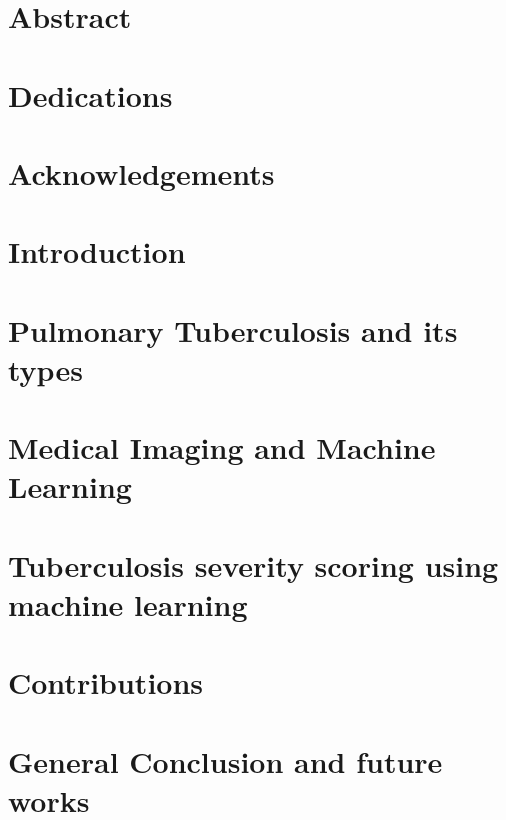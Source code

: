 \documentclass[12pt]{report}
\begin{document}
\chapter*{Abstract}

\chapter*{Dedications}

\chapter*{Acknowledgements}

\tableofcontents
{}
\newpage    
\listoffigures
\listoftables
\printacronyms[include-classes=abbrev,name=Abbreviations]
\chapter*{Introduction}

\chapter{Pulmonary Tuberculosis and its types}

\chapter{Medical Imaging and Machine Learning}

\chapter{Tuberculosis severity scoring using machine learning}

\chapter{Contributions}

\chapter*{General Conclusion  and future works}

\newpage
\newpage
 

\end{document}
